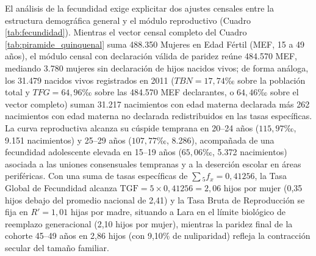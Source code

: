 \documentclass[12pt,letterpaper]{article}
\begin{document}
El análisis de la fecundidad exige explicitar dos ajustes censales entre la estructura demográfica general y el módulo reproductivo (Cuadro \ref{tab:fecundidad}). Mientras el vector censal completo del Cuadro \ref{tab:piramide_quinquenal} suma 488.350 Mujeres en Edad Fértil (MEF, 15 a 49 años), el módulo censal con declaración válida de paridez reúne 484.570 MEF, mediando 3.780 mujeres sin declaración de hijos nacidos vivos; de forma análoga, los 31.479 nacidos vivos registrados en 2011 ($TBN = 17,74\text{‰}$ sobre la población total y $TFG = 64,96\text{‰}$ sobre las 484.570 MEF declarantes, o $64,46\text{‰}$ sobre el vector completo) suman 31.217 nacimientos con edad materna declarada más 262 nacimientos con edad materna no declarada redistribuidos en las tasas específicas. La curva reproductiva alcanza su cúspide temprana en 20--24 años ($115,97\text{‰}$, 9.151 nacimientos) y 25--29 años ($107,77\text{‰}$, 8.286), acompañada de una fecundidad adolescente elevada en 15--19 años ($65,06\text{‰}$, 5.372 nacimientos) asociada a las uniones consensuales tempranas y a la deserción escolar en áreas periféricas. Con una suma de tasas específicas de $\sum {}_5f_x = 0,41256$, la Tasa Global de Fecundidad alcanza $\text{TGF} = 5 \times 0,41256 = 2,06$ hijos por mujer (0,35 hijos debajo del promedio nacional de 2,41) y la Tasa Bruta de Reproducción se fija en $R' = 1,01$ hijas por madre, situando a Lara en el límite biológico de reemplazo generacional (2,10 hijos por mujer), mientras la paridez final de la cohorte 45--49 años en 2,86 hijos (con 9,10\% de nuliparidad) refleja la contracción secular del tamaño familiar.
\end{document}
